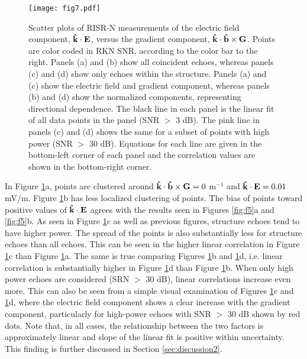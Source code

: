 \begin{figure}
\texttt{[image: fig7.pdf]}
  \caption{Scatter plots of RISR-N measurements of the electric field component, \(\mathbf{\hat{k}}\cdot\mathbf{E}\), versus the gradient component, \(\mathbf{\hat{k}}\cdot\mathbf{\hat{b}}\times\mathbf{G}\).  Points are color coded in RKN SNR, according to the color bar to the right.  Panels (a) and (b) show all coincident echoes, whereas panels (c) and (d) show only echoes within the structure.  Panels (a) and (c) show the electric field and gradient component, whereas panels (b) and (d) show the normalized components, representing directional dependence.  The black line in each panel is the linear fit of all data points in the panel (SNR \(>\) 3 dB).  The pink line in panels (c) and (d) shows the same for a subset of points with high power (SNR \(>\) 30 dB).  Equations for each line are given in the bottom-left corner of each panel and the correlation values are shown in the bottom-right corner.}
  \label{fig:f7}
\end{figure}

In Figure \ref{fig:f7}a, points are clustered around \(\mathbf{\hat{k}}\cdot\mathbf{\hat{b}}\times\mathbf{G} = 0\) m\(^{-1}\) and \(\mathbf{\hat{k}}\cdot\mathbf{E} = 0.01\) mV/m.  Figure \ref{fig:f7}b has less localized clustering of points.  The bias of points toward positive values of \(\mathbf{\hat{k}}\cdot\mathbf{E}\) agrees with the results seen in Figures \ref{fig:f5}a and \ref{fig:f5}b.  As seen in Figure \ref{fig:f7}c as well as previous figures, structure echoes tend to have higher power.  The spread of the points is also substantially less for structure echoes than all echoes.  This can be seen in the higher linear correlation in Figure \ref{fig:f7}c than Figure \ref{fig:f7}a.  The same is true comparing Figures \ref{fig:f7}b and \ref{fig:f7}d, i.e. linear correlation is substantially higher in Figure \ref{fig:f7}d than Figure \ref{fig:f7}b. When only high power echoes are considered (SRN \(>\) 30 dB), linear correlations increase even more.  This can also be seen from a simple visual examination of Figures \ref{fig:f7}c and \ref{fig:f7}d, where the electric field component shows a clear increase with the gradient component, particularly for high-power echoes with SNR \(>\) 30 dB shown by red dots. Note that, in all cases, the relationship between the two factors is approximately linear and slope of the linear fit is positive within uncertainty. This finding is further discussed in Section \ref{sec:discussion2}.




